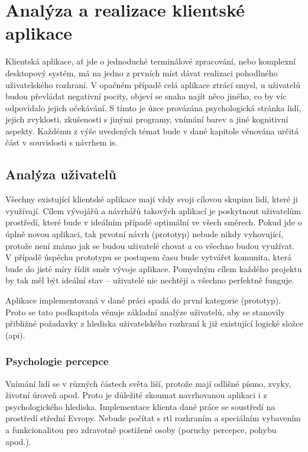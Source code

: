 \chapter{Analýza a realizace klientské aplikace}


Klientská aplikace, ať jde o jednoduché terminálové zpracování, nebo komplexní desktopový systém, má na jedno z prvních míst dávat realizaci pohodlného uživatelského rozhraní. V opačném případě celá aplikace ztrácí smysl, u uživatelů budou převládat negativní pocity, objeví se snaha najít něco jiného, co by víc odpovídalo jejich očekávání. S tímto je úzce provázána psychologická stránka lidí, jejich zvyklosti, zkušenosti s jinými programy, vnímání barev a jiné kognitivní aspekty. Každému z výše uvedených témat bude v dané kapitole věnována určitá část v souvislosti s návrhem \gls{is}.



\section{Analýza uživatelů}

Všechny existující klientské aplikace mají vždy svoji cílovou skupinu lidí, které ji využívají. Cílem vývojářů a návrhářů takových aplikací je poskytnout uživatelům prostředí, které bude v ideálním případě optimální ve všech směrech. Pokud jde o úplně novou aplikaci, tak prvotní návrh (prototyp) nebude nikdy vyhovující, protože není známo jak se budou uživatelé chovat a co všechno budou využívat. V případě úspěchu prototypu se postupem času bude vytvářet komunita, která bude do jisté míry řídit směr vývoje aplikace. Pomyslným cílem každého projektu by tak měl být ideální stav -- uživatelé nic nechtějí a všechno perfektně funguje.

Aplikace implementovaná v dané práci spadá do první kategorie (prototyp). Proto se tato podkapitola věnuje základní analýze uživatelů, aby se stanovily přibližné požadavky z hlediska uživatelského rozhraní k již existující logické složce (\gls{api}).


\subsection{Psychologie percepce}

Vnímání lidí se v různých částech světa liší, protože mají odlišné písmo, zvyky, životní úroveň apod. Proto je důležité zkoumat navrhovanou aplikaci i z psychologického hlediska. Implementace klienta dané práce se soustředí na prostředí střední Evropy. Nebude počítat s \gls{rtl} rozhraním a speciálním vybavením a funkcionalitou pro zdravotně postižené osoby (poruchy percepce, pohybu apod.). 

